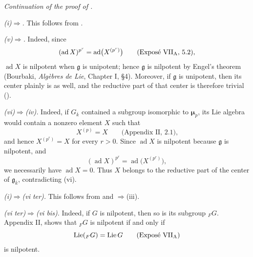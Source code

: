 
\medskip\noindent\textit{Continuation of the proof of .}

\medskip\noindent
\textit{(i)\(\Rightarrow\).}\quad
This follows from .

\medskip\noindent
\textit{(v)\(\Rightarrow\).}\quad
Indeed, since
\[
  (\operatorname{ad}X)^{p^r}
    =\operatorname{ad}\bigl(X^{(p^r)}\bigr)
  \qquad\text{(Exposé VII\textsubscript{A}, 5.2),}
\]
\(\operatorname{ad}X\) is nilpotent when \(\mathfrak g\) is
unipotent; hence \(\mathfrak g\) is nilpotent by Engel's theorem
(Bourbaki, \emph{Algèbres de Lie}, Chapter I, \S4).
Moreover, if \(\mathfrak g\) is unipotent, then its center plainly
is as well, and the reductive part of that center is therefore
trivial ().

\medskip\noindent
\textit{(vi)\(\Rightarrow\)(iv).}\quad
Indeed, if \(G_{\overline{k}}\) contained a subgroup isomorphic to
\(\boldsymbol\mu_p\), its Lie algebra would contain a nonzero
element \(X\) such that
\[
  X^{(p)}=X
  \qquad\text{(Appendix II, 2.1),}
\]
and hence \(X^{(p^r)}=X\) for every \(r>0\).
Since \(\operatorname{ad}X\) is nilpotent because \(\mathfrak g\)
is nilpotent, and
\[
  (\operatorname{ad}X)^{p^r}
    =\operatorname{ad}\bigl(X^{(p^r)}\bigr),
\]
we necessarily have \(\operatorname{ad}X=0\).  Thus \(X\) belongs
to the reductive part of the center of
\(\mathfrak g_{\overline{k}}\), contradicting (vi).

\medskip\noindent
\textit{(i)\(\Rightarrow\)(vi ter).}\quad
This follows from  and \(\Rightarrow\)(iii).

\medskip\noindent
\textit{(vi ter)\(\Rightarrow\)(vi bis).}\quad
Indeed, if \(G\) is nilpotent, then so is its subgroup
\({}_{F}G\).  Appendix II,  shows that \({}_{F}G\) is
nilpotent if and only if
\[
  \operatorname{Lie}({}_{F}G)=\operatorname{Lie}G
  \qquad\text{(Exposé VII\textsubscript{A})}
\]
is nilpotent.

